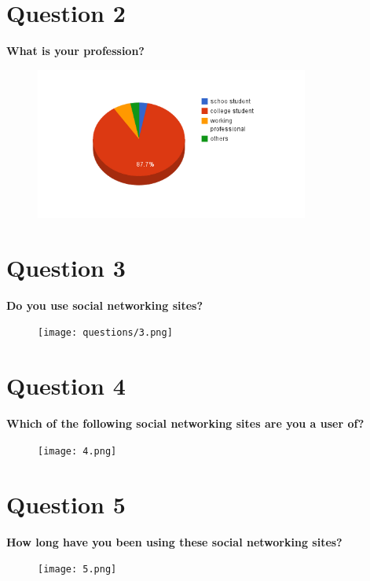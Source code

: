 \documentclass[11pt]{book}
\begin{document}
\newpage
\chapter{Question 2}
\textbf{What is your profession?
}
\begin{figure}[ht!]
	\centering
	\includegraphics[width=90mm]{questions/2.png}
	\label{overflow}
\end{figure}

\newpage
\chapter{Question 3}
\textbf{Do you use social networking sites?
}
\begin{figure}[ht!]
	\centering
	\texttt{[image: questions/3.png]}
	\label{overflow}
\end{figure}

\newpage
\chapter{Question 4}
\textbf{Which of the following social networking sites are you a user of?
}
\begin{figure}[ht!]
	\centering
	\texttt{[image: 4.png]}
	\label{overflow}
\end{figure}


\newpage
\chapter{Question 5}
\textbf{How long have you been using these social networking sites?
}
\begin{figure}[ht!]
	\centering
	\texttt{[image: 5.png]}
	\label{overflow}
\end{figure}


\newpage
\end{document}
